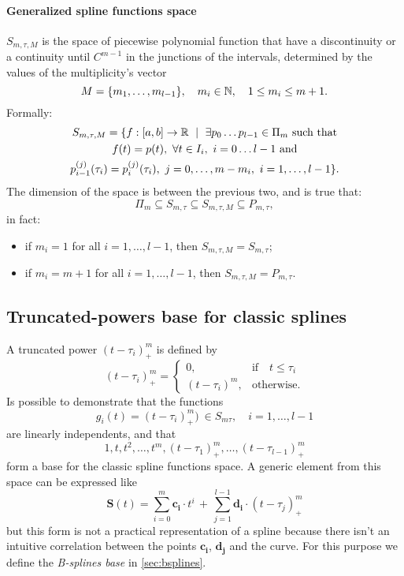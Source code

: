 \documentclass[dissertation.tex]{subfiles}
\begin{document}
\paragraph{Generalized spline functions space} $S_{m,\tau,M}$ is the
space of piecewise polynomial function that have a discontinuity or a
continuity until $C^{m-1}$ in the junctions of the intervals,
determined by the values of the multiplicity's
vector
$$
M=\{m_1,\dots,m_{l-1}\},\quad m_i\in\mathbb{N},\quad 1\leq m_i\leq m+1.
$$
Formally:
\begin{multline*}
  S_{m,\tau,M}=\{f:[a,b]\rightarrow\mR\ \mid\ \exists p_0\dots
  p_{l-1}\in\Pi_m \ \text{such that}\\
  f(t)=p(t),\ \forall t\in I_i,\
  i=0\dots l-1\ \text{and}\\
  p_{i-1}^{(j)}(\tau_i)=p_{i}^{(j)}(\tau_i),\ j=0,\dots,m-m_i,\ i=1,\dots,l-1\}.
\end{multline*}
The dimension of the space is between the previous two, and is true
that:
$$
\Pi_m\subseteq S_{m,\tau}\subseteq S_{m,\tau,M}\subseteq P_{m,\tau},
$$
in fact:
\begin{itemize}
  \item if $m_i=1$ for all $i=1,\dots,l-1$, then
    $S_{m,\tau,M}=S_{m,\tau}$;
  \item if $m_i=m+1$ for all $i=1,\dots,l-1$, then
    $S_{m,\tau,M}=P_{m,\tau}$.
\end{itemize}

\subsection{Truncated-powers base for classic splines}\label{sec:truncpow}
A truncated power $(t-\tau_i)_+^m$ is
defined by
$$
(t-\tau_i)_+^m=
\begin{cases}
  0,&\mbox{if}\quad t\leq\tau_i\\
  (t-\tau_i)^m, &\mbox{otherwise}.
\end{cases}
$$
Is possible to demonstrate that the functions
$$
g_i(t)=(t-\tau_i)_+^m)\ \in S_{m\tau},\quad i=1,\dots,l-1
$$
are linearly independents, and that
$$
1,t,t^2,\dots,t^m,(t-\tau_1)_+^m,\dots,(t-\tau_{l-1})_+^m
$$
form a base for the classic spline functions space. A generic element
from this space can be expressed like
$$
\mathbf{S}(t)=\sum_{i=0}^m \mathbf{c_i}\cdot t^i\, +\, \sum_{j=1}^{l-1} \mathbf{d_i}\cdot (t-\tau_j)_+^m
$$
but this form is not a practical representation of a spline because
there isn't an intuitive correlation between the points
$\mathbf{c_i}$, $\mathbf{d_j}$ and the curve. For this purpose we
define the \emph{B-splines base} in \cref{sec:bsplines}.
\end{document}

